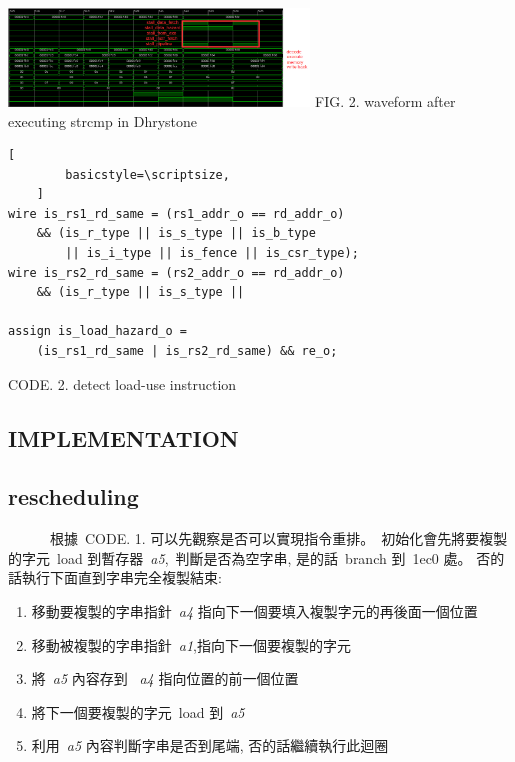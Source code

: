 \documentclass{article}
\begin{document}
\begin{CJK*}{UTF8}{bsmi}
\begin{multicols}{2}
\begin{flushleft}
    \begin{center}
        \includegraphics[width=8cm]{strcmp}
        \small FIG. 2. waveform after executing strcmp in Dhrystone
    \end{center}
\end{flushleft}

\begin{center}
    \begin{lstlisting}[
        basicstyle=\scriptsize, 
    ]
wire is_rs1_rd_same = (rs1_addr_o == rd_addr_o) 
    && (is_r_type || is_s_type || is_b_type 
        || is_i_type || is_fence || is_csr_type);
wire is_rs2_rd_same = (rs2_addr_o == rd_addr_o)
    && (is_r_type || is_s_type ||

assign is_load_hazard_o = 
    (is_rs1_rd_same | is_rs2_rd_same) && re_o;
    \end{lstlisting}
    \small CODE. 2. detect load-use instruction
\end{center}

\newpage

\begin{center}
    \section*{IMPLEMENTATION}    
    \subsection*{rescheduling}
\end{center}
\begin{flushleft}
    \ \ \ \ \ \ 根據\ CODE. 1. 可以先觀察是否可以實現指令重排。\
    初始化會先將要複製的字元\ load 到暫存器\ \textit{a5},\
    判斷是否為空字串, 是的話\ branch 到\ 1ec0 處。\newline
    否的話執行下面直到字串完全複製結束:\newline
    \begin{enumerate}
        \item 移動要複製的字串指針\ \textit{a4} 指向下一個要填入複製字元的再後面一個位置\
        \item 移動被複製的字串指針\ \textit{a1},指向下一個要複製的字元\
        \item 將\ \textit{a5} 內容存到 \ \textit{a4} 指向位置的前一個位置\
        \item 將下一個要複製的字元\ load 到\ \textit{a5}\
        \item 利用\ \textit{a5} 內容判斷字串是否到尾端, 否的話繼續執行此迴圈\newline
    \end{enumerate}
    

\end{flushleft}
\end{multicols}
\end{CJK*}
\end{document}
